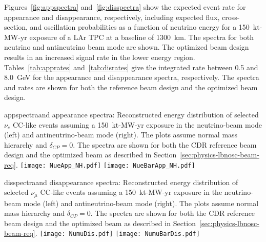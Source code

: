 Figures~\ref{fig:appspectra} and~\ref{fig:disspectra} 
show the expected event rate for \nue appearance and \numu disappearance, respectively, including
expected flux, cross-section, and oscillation probabilities as a function 
of neutrino energy for a 150~kt-MW-yr exposure of a LAr TPC at a baseline of 1300~km. The spectra for both neutrino and antineutrino beam mode are shown.  The optimized beam design results in an increased signal rate in the lower energy region. Tables~\ref{tab:apprates} and~\ref{tab:disrates} give the integrated rate between 0.5 and 8.0~GeV for the appearance and disappearance spectra, respectively.  The spectra and rates are shown for both the reference beam design and the optimized beam design.

\begin{cdrfigure}{appspectra}{\nue and \anue appearance spectra: Reconstructed energy distribution of selected $\nu_e$ CC-like events assuming a 150~kt-MW-yr exposure in the neutrino-beam mode (left) and antineutrino-beam mode (right).  The plots assume normal mass hierarchy and $\delta_{CP} = 0$.  The spectra are shown for both the CDR reference beam design and the optimized beam as described in Section~\ref{sec:physics-lbnosc-beam-req}.}
 \texttt{[image: NueApp\_NH.pdf]}
 \texttt{[image: NueBarApp\_NH.pdf]}
\end{cdrfigure}

\begin{cdrfigure}{disspectra}{\numu and \anumu disappearance spectra: Reconstructed energy distribution of selected $\nu_{\mu}$ CC-like events assuming a 150~kt-MW-yr exposure in the neutrino-beam mode (left) and antineutrino-beam mode (right).  The plots assume normal mass hierarchy and $\delta_{CP} = 0$.  The spectra are shown for both the CDR reference beam design and the optimized beam as described in Section~\ref{sec:physics-lbnosc-beam-req}.}
 \texttt{[image: NumuDis.pdf]}
 \texttt{[image: NumuBarDis.pdf]}
\end{cdrfigure}

